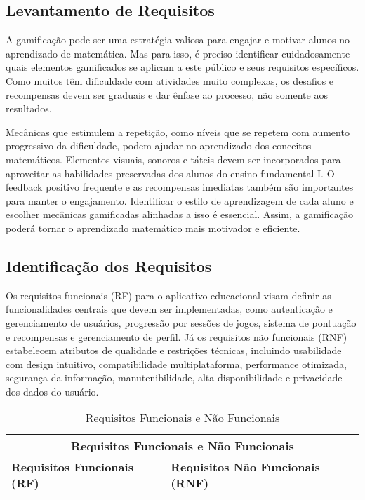 \begin{itemize}
\section{Levantamento de Requisitos}

A gamificação pode ser uma estratégia valiosa para engajar e motivar alunos no aprendizado de matemática. Mas para isso, é preciso identificar cuidadosamente quais elementos gamificados se aplicam a este público e seus requisitos específicos. Como muitos têm dificuldade com atividades muito complexas, os desafios e recompensas devem ser graduais e dar ênfase ao processo, não somente aos resultados.

Mecânicas que estimulem a repetição, como níveis que se repetem com aumento progressivo da dificuldade, podem ajudar no aprendizado dos conceitos matemáticos. Elementos visuais, sonoros e táteis devem ser incorporados para aproveitar as habilidades preservadas dos alunos do ensino fundamental I. O feedback positivo frequente e as recompensas imediatas também são importantes para manter o engajamento. Identificar o estilo de aprendizagem de cada aluno e escolher mecânicas gamificadas alinhadas a isso é essencial. Assim, a gamificação poderá tornar o aprendizado matemático mais motivador e eficiente.


\subsection{Identificação dos Requisitos}


Os requisitos funcionais (RF) para o aplicativo educacional visam definir as funcionalidades centrais que devem ser implementadas, como autenticação e gerenciamento de usuários, progressão por sessões de jogos, sistema de pontuação e recompensas e gerenciamento de perfil. 
Já os requisitos não funcionais (RNF) estabelecem atributos de qualidade e restrições técnicas, incluindo usabilidade com design intuitivo, compatibilidade multiplataforma, performance otimizada, segurança da informação, manutenibilidade, alta disponibilidade e privacidade dos dados do usuário.


\begin{longtable}{|p{6cm}|p{6cm}|}
    \caption{Requisitos Funcionais e Não Funcionais}
    \label{tab:requisitos}\\
    \hline
    \multicolumn{2}{|c|}{\textbf{Requisitos Funcionais e Não Funcionais}} \\
    
    \hline
    \textbf{Requisitos Funcionais (RF)} & \textbf{Requisitos Não Funcionais (RNF)} \\
    \hline
    \endfirsthead


\end{longtable}
\end{itemize}
